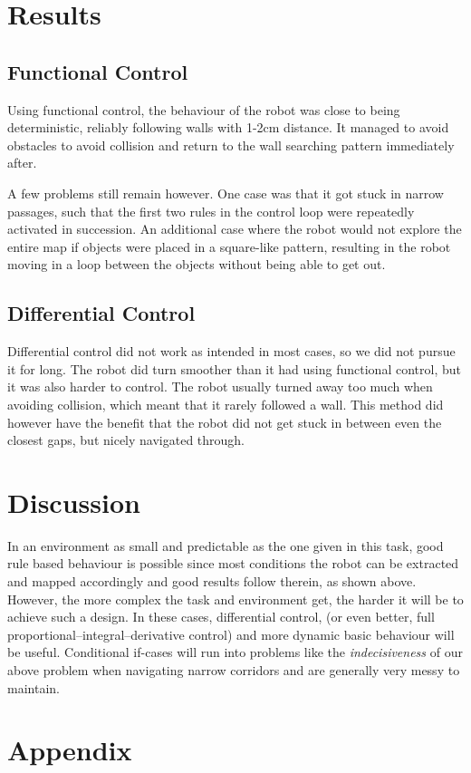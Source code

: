 \documentclass[paper=a4, fontsize=12pt]{scrartcl}	%
\numberwithin{equation}{section}		%
\numberwithin{figure}{section}			%
\numberwithin{table}{section}				%
\begin{document}
\section{Results}
\subsection{Functional Control}
Using functional control, the behaviour of the robot was close to being
deterministic, reliably following walls with 1-2cm distance. It managed to avoid
obstacles to avoid collision and return to the wall searching pattern
immediately after.

A few problems still remain however. One case was that it got stuck in narrow
passages, such that the first two rules in the control loop were repeatedly
activated in succession. An additional case where the robot would not explore
the entire map if objects were placed in a square-like pattern, resulting in the
robot moving in a loop between the objects without being able to get out.
\subsection{Differential Control}
Differential control did not work as intended in most cases, so we did not
pursue it for long. The robot did turn smoother than it had using functional
control, but it was also harder to control. The robot usually turned away too
much when avoiding collision, which meant that it rarely followed a wall. This
method did however have the benefit that the robot did not get stuck in between
even the closest gaps, but nicely navigated through.
\section{Discussion}
In an environment as small and predictable as the one given in this task, good
rule based behaviour is possible since most conditions the robot can be
extracted and mapped accordingly and good results follow therein, as shown
above. However, the more complex the task and environment get, the harder it
will be to achieve such a design. In these cases, differential control, (or even
better, full proportional–integral–derivative control) and more dynamic basic
behaviour will be useful. Conditional if-cases will run into problems like the
\emph{indecisiveness} of our above problem when navigating narrow corridors and
are generally very messy to maintain.
\section{Appendix}
\end{document}
